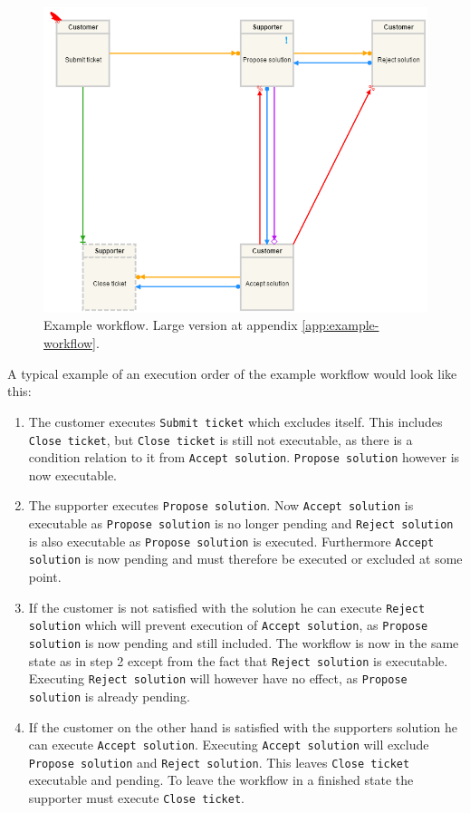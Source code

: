 \documentclass{article}
\begin{document}
		\begin{figure}[!ht]
			\centering
			\includegraphics[width=\textwidth]{figures/exampleWorkflow.png}
		 	\caption[Example workflow]
		 	{Example workflow. Large version at appendix \ref{app:example-workflow}.}
		 	\label{fig:exampleWorkflow}
		\end{figure}
		\FloatBarrier

		A typical example of an execution order of the example workflow would look like this:
		\begin{enumerate}
			\item The customer executes \texttt{Submit ticket} which excludes itself. 
			This includes \texttt{Close ticket}, but \texttt{Close ticket} is still not executable, as there is a condition relation to it from \texttt{Accept solution}.
			\texttt{Propose solution} however is now executable.
			\item The supporter executes \texttt{Propose solution}. Now \texttt{Accept solution} is executable as \texttt{Propose solution} is no longer pending and \texttt{Reject solution} is also executable as \texttt{Propose solution} is executed. 
			Furthermore \texttt{Accept solution} is now pending and must therefore be executed or excluded at some point.
			\item If the customer is not satisfied with the solution he can execute \texttt{Reject solution} which will prevent execution of \texttt{Accept solution}, as \texttt{Propose solution} is now pending and still included. 
			The workflow is now in the same state as in step 2 except from the fact that \texttt{Reject solution} is executable. 
			Executing \texttt{Reject solution} will however have no effect, as \texttt{Propose solution} is already pending.
			\item If the customer on the other hand is satisfied with the supporters solution he can execute \texttt{Accept solution}.
			Executing \texttt{Accept solution} will exclude \texttt{Propose solution} and \texttt{Reject solution}.
			This leaves \texttt{Close ticket} executable and pending.
			To leave the workflow in a finished state the supporter must execute \texttt{Close ticket}. 
		\end{enumerate}
\end{document}
